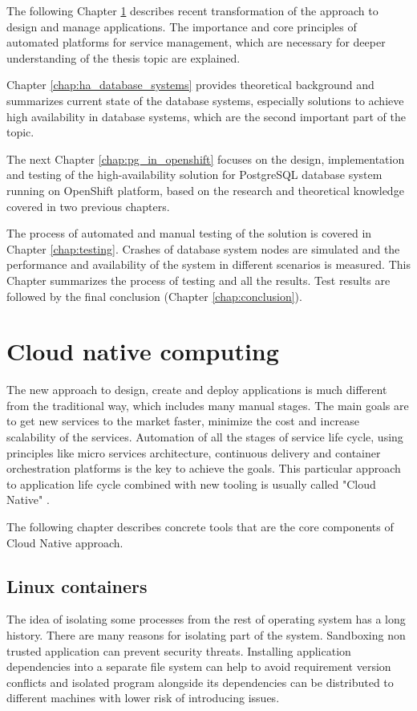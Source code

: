 \documentclass[
  digital, %
  twoside, %
  table,   %
  lof,     %
  lot,     %
]{fithesis3}
\begin{document}
The following Chapter \ref{chap:cloud_native} describes recent transformation of the approach to design and manage applications. The importance and core principles of automated platforms for service management, which are necessary for deeper understanding of the thesis topic are explained.

Chapter \ref{chap:ha_database_systems} provides theoretical background and summarizes current state of the database systems, especially solutions to achieve high availability in database systems, which are the second important part of the topic.

The next Chapter \ref{chap:pg_in_openshift} focuses on the design, implementation and testing of the high-availability solution for PostgreSQL database system running on OpenShift platform, based on the research and theoretical knowledge covered in two previous chapters.

The process of automated and manual testing of the solution is covered in Chapter \ref{chap:testing}. Crashes of database system nodes are simulated and the performance and availability of the system in different scenarios is measured. This Chapter summarizes the process of testing and all the results. Test results are followed by the final conclusion (Chapter \ref{chap:conclusion}).

\chapter{Cloud native computing} \label{chap:cloud_native}
The new approach to design, create and deploy applications is much different from the traditional way, which includes many manual stages. The main goals are to get new services to the market faster, minimize the cost and increase scalability of the services. Automation of all the stages of service life cycle, using principles like micro services architecture, continuous delivery and container orchestration platforms is the key to achieve the goals. This particular approach to application life cycle combined with new tooling is usually called "Cloud Native" \cite{cloud_native}.

The following chapter describes concrete tools that are the core components of Cloud Native approach.

\section{Linux containers} \label{sec:containers}
The idea of isolating some processes from the rest of operating system has a long history. There are many reasons for isolating part of the system. Sandboxing non trusted application can prevent security threats. Installing application dependencies into a separate file system can help to avoid requirement version conflicts and isolated program alongside its dependencies can be distributed to different machines with lower risk of introducing issues.
\end{document}
